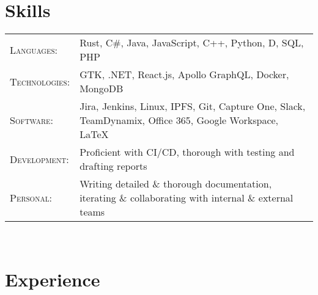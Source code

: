 \documentclass[letterpaper,8pt]{article} %
\begin{document}

\section{Skills}

\footnotesize{\begin{tabular}{ll}
\textsc{Languages}: & Rust, C\#, Java, JavaScript, C++, Python, D, SQL, PHP\\
\textsc{Technologies}: & GTK, .NET, React.js, Apollo GraphQL, Docker, MongoDB\\
\textsc{Software}: & Jira, Jenkins, Linux, IPFS, Git, Capture One, Slack, TeamDynamix, Office 365, Google Workspace, \LaTeX\\
\textsc{Development}: & Proficient with CI/CD, thorough with testing and drafting reports\\
\textsc{Personal}: & Writing detailed \& thorough documentation, iterating \& collaborating with internal \& external teams

\end{tabular}}\normalsize\\


\section{Experience}
\end{document}

